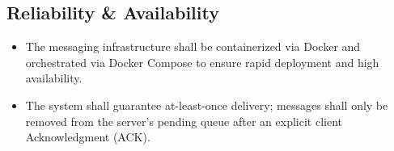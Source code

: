 \documentclass[12pt, a4paper]{article}
\begin{document}
\subsection{Reliability \& Availability}
\begin{itemize}
    \item The messaging infrastructure shall be containerized via Docker and orchestrated via Docker Compose to ensure rapid deployment and high availability.
    \item The system shall guarantee at-least-once delivery; messages shall only be removed from the server's pending queue after an explicit client Acknowledgment (ACK).
\end{itemize}
\end{document}
